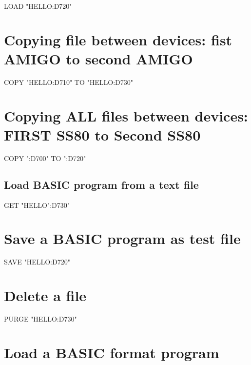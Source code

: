 \begin{DoxyPre}
  LOAD "HELLO:D720"
\section*{Copying file between devices: fist AMIGO to second AMIGO}\end{DoxyPre}



\begin{DoxyPre}
  COPY "HELLO:D710" TO "HELLO:D730"
\section*{Copying ALL files between devices: FIRST SS80 to Second SS80}\end{DoxyPre}



\begin{DoxyPre}
  COPY ":D700" TO ":D720"\end{DoxyPre}



\begin{DoxyPre}\section*{Load BASIC program from a text file}\end{DoxyPre}



\begin{DoxyPre}
  GET "HELLO":D730"
\section*{Save a BASIC program as test file}\end{DoxyPre}



\begin{DoxyPre}
  SAVE "HELLO:D720"
\section*{Delete a file}\end{DoxyPre}



\begin{DoxyPre}
  PURGE "HELLO:D730"
\section*{Load a BASIC format program}\end{DoxyPre}



